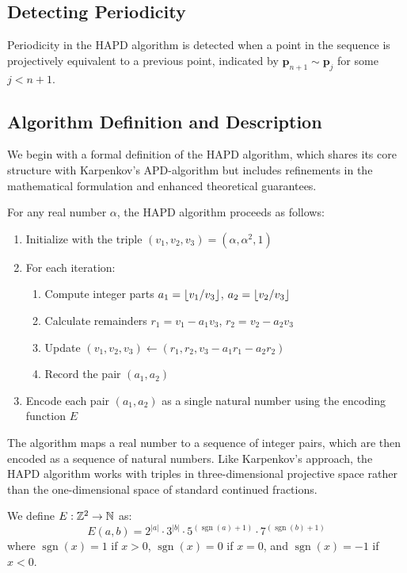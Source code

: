 \subsection{Detecting Periodicity}

Periodicity in the HAPD algorithm is detected when a point in the sequence is projectively equivalent to a previous point, indicated by $\mathbf{p}_{n+1} \sim \mathbf{p}_j$ for some $j < n+1$.

\subsection{Algorithm Definition and Description}

We begin with a formal definition of the HAPD algorithm, which shares its core structure with Karpenkov's APD-algorithm but includes refinements in the mathematical formulation and enhanced theoretical guarantees.

\begin{algorithm_def}\label{alg:hapd}
For any real number $\alpha$, the HAPD algorithm proceeds as follows:
\begin{enumerate}
    \item Initialize with the triple $(v_1, v_2, v_3) = (\alpha, \alpha^2, 1)$
    \item For each iteration:
    \begin{enumerate}
        \item Compute integer parts $a_1 = \lfloor v_1/v_3 \rfloor$, $a_2 = \lfloor v_2/v_3 \rfloor$
        \item Calculate remainders $r_1 = v_1 - a_1v_3$, $r_2 = v_2 - a_2v_3$
        \item Update $(v_1, v_2, v_3) \leftarrow (r_1, r_2, v_3 - a_1r_1 - a_2r_2)$
        \item Record the pair $(a_1, a_2)$
    \end{enumerate}
    \item Encode each pair $(a_1, a_2)$ as a single natural number using the encoding function $E$
\end{enumerate}
\end{algorithm_def}

The algorithm maps a real number to a sequence of integer pairs, which are then encoded as a sequence of natural numbers. Like Karpenkov's approach, the HAPD algorithm works with triples in three-dimensional projective space rather than the one-dimensional space of standard continued fractions.

\begin{definition}\label{def:encoding}
We define $E : \mathbb{Z}^2 \to \mathbb{N}$ as:
\begin{equation}
E(a, b) = 2^{|a|} \cdot 3^{|b|} \cdot 5^{(\operatorname{sgn}(a)+1)} \cdot 7^{(\operatorname{sgn}(b)+1)}
\end{equation}
where $\operatorname{sgn}(x) = 1$ if $x > 0$, $\operatorname{sgn}(x) = 0$ if $x = 0$, and $\operatorname{sgn}(x) = -1$ if $x < 0$.
\end{definition}

